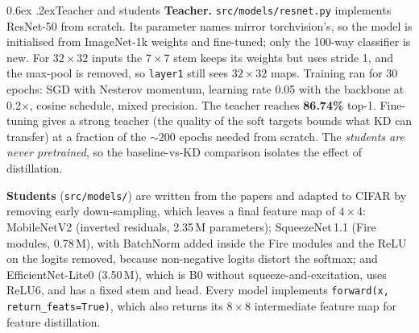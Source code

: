 \documentclass[10pt,a4paper]{article}
\makeatletter
\renewcommand\subsection{\@startsection{subsection}{2}{\z@}{-1.6ex\@plus -1ex \@minus -.2ex}%
  {0.6ex \@plus .2ex}{\normalfont\normalsize\bfseries}}
\newcommand{\code}[1]{\texttt{\small #1}}
\makeatother
\begin{document}
\subsection{Teacher and students}
\textbf{Teacher.} \code{src/models/resnet.py} implements ResNet-50 from scratch. Its parameter names
mirror torchvision's, so the model is initialised from ImageNet-1k weights and fine-tuned; only the
100-way classifier is new. For $32{\times}32$ inputs the $7{\times}7$ stem keeps its weights but uses
stride 1, and the max-pool is removed, so \code{layer1} still sees $32{\times}32$ maps. Training ran
for 30 epochs: SGD with Nesterov momentum, learning rate 0.05 with the backbone at 0.2$\times$,
cosine schedule, mixed precision. The teacher reaches \textbf{86.74\%} top-1. Fine-tuning gives a
strong teacher (the quality of the soft targets bounds what KD can transfer) at a fraction of the
$\sim$200 epochs needed from scratch. The \emph{students are never pretrained}, so the baseline-vs-KD
comparison isolates the effect of distillation.

\textbf{Students} (\code{src/models/}) are written from the papers and adapted to CIFAR by removing
early down-sampling, which leaves a final feature map of $4{\times}4$:
MobileNetV2 (inverted residuals, 2.35\,M parameters);
SqueezeNet\,1.1 (Fire modules, 0.78\,M), with BatchNorm added inside the Fire modules and the ReLU on the logits
removed, because non-negative logits distort the softmax;
and EfficientNet-Lite0 (3.50\,M), which is B0 without squeeze-and-excitation, uses ReLU6, and has a fixed
stem and head. Every model implements \code{forward(x, return\_feats=True)}, which also returns its
$8{\times}8$ intermediate feature map for feature distillation.
\end{document}
